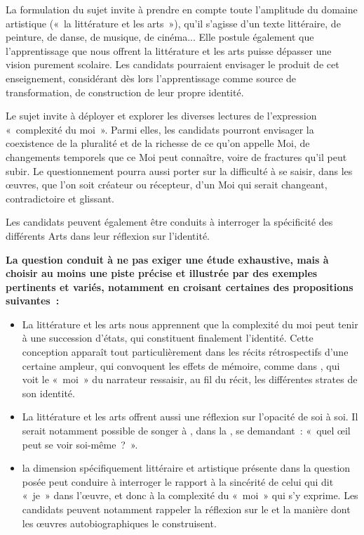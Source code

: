 		{La formulation du sujet invite à prendre en compte toute l'amplitude du domaine
artistique («~la littérature et les arts~»), qu'il s'agisse d'un texte littéraire, de peinture,
de danse, de musique, de cinéma... Elle postule également que l'apprentissage que
nous offrent la littérature et les arts puisse dépasser une vision purement scolaire. Les
candidats pourraient envisager le produit de cet enseignement, considérant dès lors l'apprentissage comme source de transformation, de construction de leur propre
identité.

Le sujet invite à déployer et explorer les diverses lectures de
l'expression «~complexité du moi~». Parmi elles, les candidats pourront envisager la
coexistence de la pluralité et de la richesse de ce qu'on appelle Moi, de changements
temporels que ce Moi peut connaître, voire de fractures qu'il peut subir. Le
questionnement pourra aussi porter sur la difficulté à se saisir, dans les œuvres, que
l'on soit créateur ou récepteur, d'un Moi qui serait changeant, contradictoire et glissant.

Les candidats peuvent également être conduits à interroger la spécificité des
différents Arts dans leur réflexion sur l'identité.

\textbf{La question conduit à ne pas exiger une étude exhaustive, mais à choisir au
moins une piste précise et illustrée par des exemples pertinents et variés,
notamment en croisant certaines des propositions suivantes~:}

\begin{itemize}

\item La littérature et les arts nous apprennent que la complexité du moi peut tenir
à une succession d'états, qui constituent finalement l'identité. Cette conception
apparaît tout particulièrement dans les récits rétrospectifs d'une certaine ampleur, qui
convoquent les effets de mémoire, comme dans , qui
voit le «~moi~» du narrateur ressaisir, au fil du récit, les différentes strates de son
identité.

\item La littérature et les arts offrent aussi une réflexion sur l'opacité de soi à soi. Il
serait notamment possible de songer à , dans la , se
demandant~: «~quel œil peut se voir soi-même~?~».

\item la dimension spécifiquement littéraire et artistique présente dans la question
posée peut conduire à interroger le rapport à la sincérité de celui qui dit «~je~» dans
l'œuvre, et donc à la complexité du «~moi~» qui s'y exprime. Les candidats peuvent
notamment rappeler la réflexion sur le  et la manière dont les
œuvres autobiographiques le construisent.


\end{itemize}}
